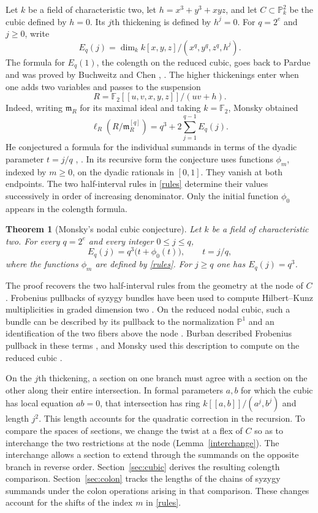\documentclass[11pt,a4paper,reqno]{amsart}
\numberwithin{equation}{section}
\theoremstyle{plain}
\newtheorem{mainresult}{Theorem}
\newcommand{\PP}{\mathbb P}
\newcommand{\m}{\mathfrak m}
\begin{document}
Let $k$ be a field of characteristic two, let $h=x^3+y^3+xyz$, and let $C\subset\PP^2_k$ be the cubic defined by $h=0$. Its $j$th thickening is defined by $h^j=0$. For $q=2^e$ and $j\ge0$, write
\[
 E_q(j)=\dim_k k[x,y,z]/(x^q,y^q,z^q,h^j).
\]
The formula for $E_q(1)$, the colength on the reduced cubic, goes back to Pardue and was proved by Buchweitz and Chen \cite[Theorem~3]{BC}, \cite{M11}. The higher thickenings enter when one adds two variables and passes to the suspension
\[
 R=\mathbb F_2[[u,v,x,y,z]]/(uv+h).
\]
Indeed, writing $\m_R$ for its maximal ideal and taking $k=\mathbb F_2$, Monsky obtained
\[
 \ell_R(R/\m_R^{[q]})=q^3+2\sum_{j=1}^{q-1}E_q(j).
\]
He conjectured a formula for the individual summands in terms of the dyadic parameter $t=j/q$ \cite[Theorem~2.2 and Conjecture~1.5]{Mon08}, \cite[Conjecture~2.3]{M09}. In its recursive form the conjecture uses functions $\phi_m$, indexed by $m\ge0$, on the dyadic rationals in $[0,1]$. They vanish at both endpoints. The two half-interval rules in \eqref{rules} determine their values successively in order of increasing denominator. Only the initial function $\phi_0$ appears in the colength formula.

\begin{mainresult}[Monsky's nodal cubic conjecture]\label{main}
Let $k$ be a field of characteristic two. For every $q=2^e$ and every integer $0\le j\le q$,
\[
 E_q(j)=q^3\bigl(t+\phi_0(t)\bigr),\qquad t=j/q,
\]
where the functions $\phi_m$ are defined by \eqref{rules}. For $j\ge q$ one has $E_q(j)=q^3$.
\end{mainresult}

The proof recovers the two half-interval rules from the geometry at the node of $C$. Frobenius pullbacks of syzygy bundles have been used to compute Hilbert--Kunz multiplicities in graded dimension two \cite{BrenRat,TriSemi}. On the reduced nodal cubic, such a bundle can be described by its pullback to the normalization $\PP^1$ and an identification of the two fibers above the node \cite{DG,BBDG}. Burban described Frobenius pullback in these terms \cite{Burban}, and Monsky used this description to compute on the reduced cubic \cite{M11}.

On the $j$th thickening, a section on one branch must agree with a section on the other along their entire intersection. In formal parameters $a,b$ for which the cubic has local equation $ab=0$, that intersection has ring $k[[a,b]]/(a^j,b^j)$ and length $j^2$. This length accounts for the quadratic correction in the recursion. To compare the spaces of sections, we change the twist at a flex of $C$ so as to interchange the two restrictions at the node (Lemma~\ref{interchange}). The interchange allows a section to extend through the summands on the opposite branch in reverse order. Section~\ref{sec:cubic} derives the resulting colength comparison. Section~\ref{sec:colon} tracks the lengths of the chains of syzygy summands under the colon operations arising in that comparison. These changes account for the shifts of the index $m$ in \eqref{rules}.
\end{document}
